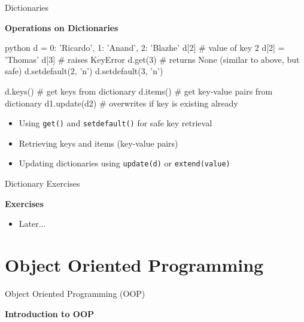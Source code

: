 \documentclass[
	11pt, 
]{beamer}
\begin{document}

\begin{frame}[fragile]{Dictionaries}

\textbf{Operations on Dictionaries}

\begin{mintedbox}{python}
d = {0: 'Ricardo', 1: 'Anand', 2: 'Blazhe'}
d[2] # value of key 2
d[2] = 'Thomas'
d[3]  # raises KeyError
d.get(3)  # returns None (similar to above, but safe)
d.setdefault(2, 'n')
d.setdefault(3, 'n')

d.keys() # get keys from dictionary
d.items() # get key-value pairs from dictionary
d1.update(d2) # overwrites if key is existing already
\end{mintedbox}

\begin{itemize}
    \item Using \texttt{get()} and \texttt{setdefault()} for safe key retrieval
    \item Retrieving keys and items (key-value pairs)
    \item Updating dictionaries using \texttt{update(d)} or \texttt{extend(value)}
\end{itemize}


\end{frame}


\begin{frame}[fragile]{Dictionary Exercises}

\begin{alertblock}{\textbf{Exercises}}
\begin{itemize}
    \item Later...
\end{itemize}

\end{alertblock}
\end{frame}


\section{Object Oriented Programming}
\begin{frame}[fragile]{Object Oriented Programming (OOP)}

\begin{block}{\textbf{Introduction to OOP}}
    
\end{block}

\end{frame}
\end{document}
